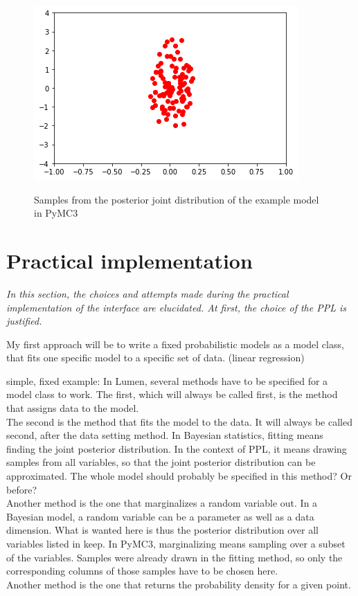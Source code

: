 \documentclass{article}
\begin{document}
\begin{figure}
	\includegraphics[width=\textwidth]{images/PyMC3_joint_posterior_samples_simple_model.png}
	\label{fig:PyMC3_joint_posterior_samples_simple_model}
	\caption[Samples from the posterior joint distribution of the example model in PyMC3]{Samples from the posterior joint distribution of the example model in PyMC3}
\end{figure}
\section{Practical implementation}

\textit{In this section, the choices and attempts made during the practical implementation of the interface are elucidated. At first, the choice of the PPL is justified.}

My first approach will be to write a fixed probabilistic models as a model class, that fits one specific model to a specific set of data. (linear regression)


simple, fixed example:
In Lumen, several methods have to be specified for a model class to work. The first, which will always be called first, is the method that assigns data to the model.
\\
The second is the method that fits the model to the data. It will always be called second, after the data setting method. In Bayesian statistics, fitting means finding the joint posterior distribution. In the context of PPL, it means drawing samples from all variables, so that the joint posterior distribution can be approximated. The whole model should probably be specified in this method? Or before?
\\
Another method is the one that marginalizes a random variable out. In a Bayesian model, a random variable can be a parameter as well as a data dimension.  What is wanted here is thus the posterior distribution over all variables listed in keep.
In PyMC3, marginalizing means sampling over a subset of the variables. Samples were already drawn in the fitting method, so only the corresponding columns of those samples have to be chosen here.
\\
Another method is the one that returns the probability density for a given point.
\end{document}
